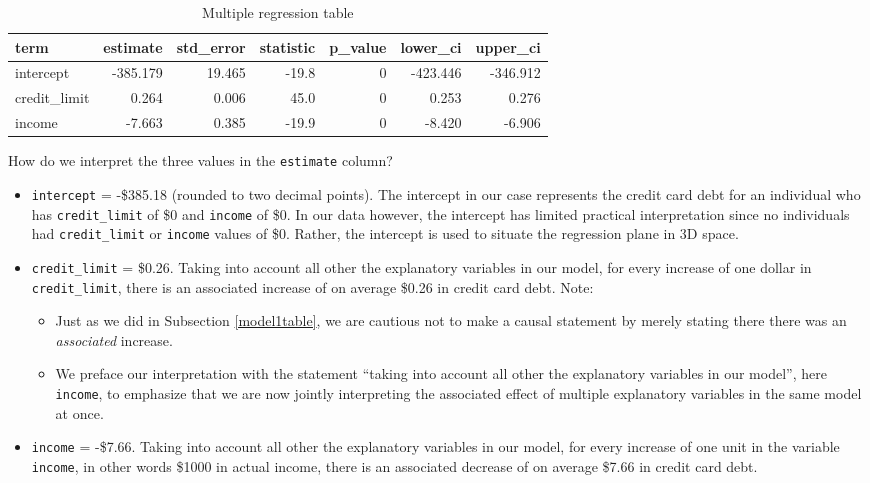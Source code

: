 \documentclass[12pt, krantz2,]{krantz}
\providecommand{\tightlist}{%
  \setlength{\itemsep}{0pt}\setlength{\parskip}{0pt}}
\begin{document}
\begin{table}[H]

\caption{\label{tab:model3-table-output}Multiple regression table}
\centering
\fontsize{10}{12}\selectfont
\begin{tabular}{lrrrrrr}
\toprule
term & estimate & std\_error & statistic & p\_value & lower\_ci & upper\_ci\\
\midrule
intercept & -385.179 & 19.465 & -19.8 & 0 & -423.446 & -346.912\\
credit\_limit & 0.264 & 0.006 & 45.0 & 0 & 0.253 & 0.276\\
income & -7.663 & 0.385 & -19.9 & 0 & -8.420 & -6.906\\
\bottomrule
\end{tabular}
\end{table}

How do we interpret the three values in the \texttt{estimate} column?

\begin{itemize}
\tightlist
\item
  \texttt{intercept} = -\$385.18 (rounded to two decimal points). The intercept in our case represents the credit card debt for an individual who has \texttt{credit\_limit} of \$0 and \texttt{income} of \$0. In our data however, the intercept has limited practical interpretation since no individuals had \texttt{credit\_limit} or \texttt{income} values of \$0. Rather, the intercept is used to situate the regression plane in 3D space.
\item
  \texttt{credit\_limit} = \$0.26. Taking into account all other the explanatory variables in our model, for every increase of one dollar in \texttt{credit\_limit}, there is an associated increase of on average \$0.26 in credit card debt. Note:

  \begin{itemize}
  \tightlist
  \item
    Just as we did in Subsection \ref{model1table}, we are cautious not to make a causal statement by merely stating there there was an \emph{associated} increase.
  \item
    We preface our interpretation with the statement ``taking into account all other the explanatory variables in our model'', here \texttt{income}, to emphasize that we are now jointly interpreting the associated effect of multiple explanatory variables in the same model at once.
  \end{itemize}
\item
  \texttt{income} = -\$7.66. Taking into account all other the explanatory variables in our model, for every increase of one unit in the variable \texttt{income}, in other words \$1000 in actual income, there is an associated decrease of on average \$7.66 in credit card debt.
\end{itemize}
\end{document}
